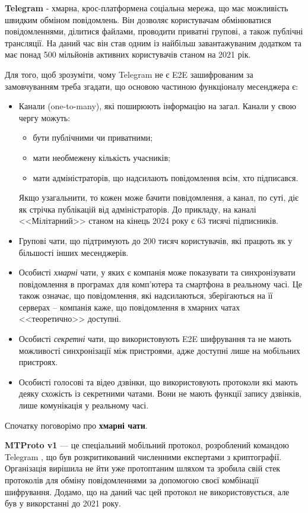 \textbf{Telegram} - хмарна, крос-платформена соціальна мережа, що має можливість швидким обміном повідомлень. Він дозволяє користувачам обмінюватися повідомленнями, ділитися файлами, проводити приватні групові, а також публічні трансляції. На даний час він став одним із найбільш завантажуваним додатком та має понад 500 мільйонів активних користувачів станом на 2021 рік.


Для того, щоб зрозуміти, чому Telegram не є E2E зашифрованим за замовчуванням треба згадати, що основою частиною функціоналу месенджера є:
\begin{itemize}
    \item Канали (one-to-many), які поширюють інформацію на загал. Канали у свою чергу можуть: 
        \begin{itemize}
            \item бути публічними чи приватними;
            \item мати необмежену кількість учасників;
            \item мати адміністраторів, що надсилають повідомлення всім, хто підписався.
        \end{itemize}
        Якщо узагальнити, то кожен може бачити повідомлення, а канал, по суті, діє як стрічка публікацій від адміністраторів. До прикладу, на каналі <<Мілітарний>> станом на кінець 2024 року є 63 тисячі підписників.
    \item Групові чати, що підтримують до 200 тисяч користувачів, які працють як у більшості інших месенджерів.
    \item Особисті \textit{хмарні} чати, у яких є компанія може показувати та синхронізувати повідомлення в програмах для комп’ютера та смартфона в реальному часі. Це також означає, що повідомлення, які надсилаються, зберігаються на її серверах – компанія каже, що повідомлення в хмарних чатах <<теоретично>> доступні.
    \item Особисті \textit{секретні} чати, що використовують E2E шифрування та не мають можливості синхронізації між пристроями, адже доступні лише на мобільних пристроях.
    \item Особисті голосові та відео дзвінки, що використовують протоколи які мають деяку схожість із секретними чатами. Вони не мають функції запису дзвінків, лише комунікація у реальному часі.
\end{itemize}


Спочатку поговорімо про \textbf{хмарні чати}. 

\textbf{MTProto v1} — це спеціальний мобільний протокол, розроблений командою Telegram \cite{telegram_mtproto1}, що був розкритикований численними експертами з криптографії. Організація вирішила не йти уже протоптаним шляхом та зробила свій стек протоколів для обміну повідомленнями за допомогою своєї комбінації шифрування. Додамо, що на даний час цей протокол не використовується, але був у викорстанні до 2021 року.

